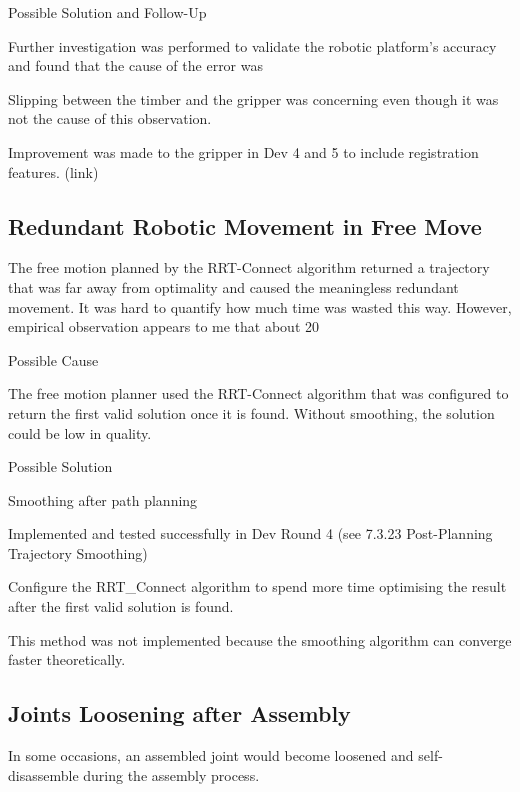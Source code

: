\begin{itemise}
\begin{itemise}
\begin{itemise}
\begin{itemise}
\begin{itemise}
Possible Solution and Follow-Up
\begin{itemise}
\item Further investigation was performed to validate the robotic platform’s accuracy and found that the cause of the error was 
\item Slipping between the timber and the gripper was concerning even though it was not the cause of this observation. 
    \begin{itemise}
    \item Improvement was made to the gripper in Dev 4 and 5 to include registration features. (link)
    \end{itemise}
\end{itemise}


\subsection{Redundant Robotic Movement in Free Move}
The free motion planned by the RRT-Connect algorithm returned a trajectory that was far away from optimality and caused the meaningless redundant movement. It was hard to quantify how much time was wasted this way. However, empirical observation appears to me that about 20%

Possible Cause

The free motion planner used the RRT-Connect algorithm that was configured to return the first valid solution once it is found. Without smoothing, the solution could be low in quality.

Possible Solution
\begin{itemise}
\item Smoothing after path planning
    \begin{itemise}
    \item Implemented and tested successfully in Dev Round 4 (see 7.3.23 Post-Planning Trajectory Smoothing)
    \end{itemise}
\item Configure the RRT_Connect algorithm to spend more time optimising the result after the first valid solution is found.
    \begin{itemise}
\item This method was not implemented because the smoothing algorithm can converge faster theoretically.
    \end{itemise}
\end{itemise}

\subsection{Joints Loosening after Assembly}
In some occasions, an assembled joint would become loosened and self-disassemble during the assembly process. 


\end{itemise}
\end{itemise}
\end{itemise}
\end{itemise}
\end{itemise}
